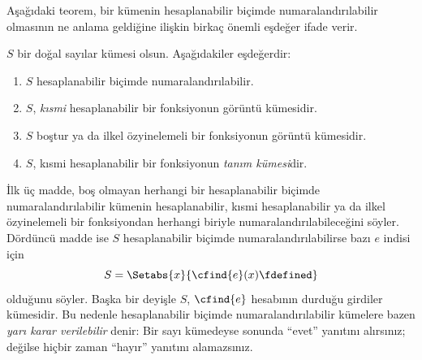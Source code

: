 \documentclass[../../../include/open-logic-section]{subfiles}
\begin{document}


Aşağıdaki teorem, bir kümenin hesaplanabilir biçimde numaralandırılabilir
olmasının ne anlama geldiğine ilişkin birkaç önemli eşdeğer ifade verir.

\begin{thm}
$S$ bir doğal sayılar kümesi olsun. Aşağıdakiler eşdeğerdir:
\begin{enumerate}
\item{} $S$ hesaplanabilir biçimde numaralandırılabilir.
\item{} $S$, \emph{kısmi} hesaplanabilir bir fonksiyonun
  görüntü kümesidir.
\item{} $S$ boştur ya da ilkel özyinelemeli bir
  fonksiyonun görüntü kümesidir.
\item{} $S$, kısmi hesaplanabilir bir fonksiyonun
  \emph{tanım kümesi}dir.
\end{enumerate}
\end{thm}

\begin{explain}
İlk üç madde, boş olmayan herhangi bir hesaplanabilir biçimde
numaralandırılabilir kümenin hesaplanabilir, kısmi hesaplanabilir ya da ilkel
özyinelemeli bir fonksiyondan herhangi biriyle numaralandırılabileceğini
söyler. Dördüncü madde ise $S$ hesaplanabilir biçimde
numaralandırılabilirse bazı $e$ indisi için
\[
  S=\Setabs{x}{\cfind{e}(x)\fdefined}
\]
olduğunu söyler. Başka bir deyişle $S$, $\cfind{e}$ hesabının durduğu
girdiler kümesidir. Bu nedenle hesaplanabilir biçimde numaralandırılabilir
kümelere bazen \emph{yarı karar verilebilir} denir: Bir sayı kümedeyse
sonunda ``evet'' yanıtını alırsınız; değilse hiçbir zaman ``hayır'' yanıtını
alamazsınız.
\end{explain}
\end{document}

